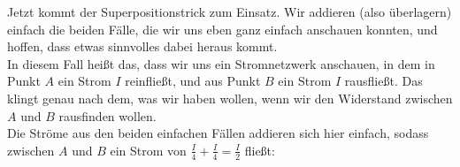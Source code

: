 \begin{Answer}[ref = infnet]
\begin{center}
				\end{center}
			Jetzt kommt der Superpositionstrick zum Einsatz. Wir \glqq addieren\grqq{} (also überlagern) einfach die beiden Fälle, die wir uns eben ganz einfach anschauen konnten, und hoffen, dass etwas sinnvolles dabei heraus kommt.\\
			In diesem Fall heißt das, dass wir uns ein Stromnetzwerk anschauen, in dem in Punkt $A$ ein Strom $I$ reinfließt, und aus Punkt $B$ ein Strom $I$ rausfließt. Das klingt genau nach dem, was wir haben wollen, wenn wir den Widerstand zwischen $A$ und $B$ rausfinden wollen.\\
			Die Ströme aus den beiden einfachen Fällen addieren sich hier einfach, sodass zwischen $A$ und $B$ ein Strom von $\frac{I}{4} + \frac{I}{4} = \frac{I}{2}$ fließt:
							\begin{center}
\end{center}
\end{Answer}
